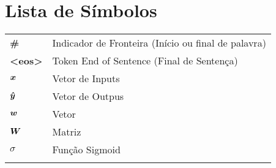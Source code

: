 \chapter{Lista de Símbolos}
\begin{tabular}{ll}
\vspace{2mm}
\textbf{\#}   &Indicador de Fronteira (Início ou final de palavra)\\ \vspace{2mm}
\textbf{<eos>}   &Token End of Sentence (Final de Sentença)\\ \vspace{2mm}
$\bm{x}$    &Vetor de Inputs\\ \vspace{2mm}
$\bm{\hat{y}}$    &Vetor de Outpus\\ \vspace{2mm}
$\bm{w}$    &Vetor\\ \vspace{2mm}
$\bm{W}$    &Matriz\\ \vspace{2mm}
$\sigma$ & Função Sigmoid \\ \vspace{2mm}
\end{tabular}
